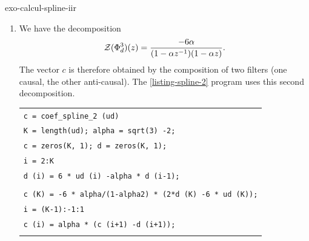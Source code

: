 \begin{correction}{exo-calcul-spline-iir}
\begin{enumerate}
\item We have the decomposition
\begin{equation*}
\mathcal{Z} (\Phi_d^3) (z) = \frac{-6 \alpha}{(1- \alpha z^{-1}) (1- \alpha z)}.
\end{equation*}
The vector $ c $ is therefore obtained by the composition of two filters (one causal, the other anti-causal). The \Matlab{} \ref{listing-spline-2} program uses this second decomposition.

\begin{listing} 
\begin{footnotesize} 
{\upshape
\begin{tabular}{l} \texttt{\pfunction c = coef\_spline\_2 (ud)} \\
\texttt{K = length(ud); alpha = sqrt(3) -2;} \\
\texttt{c = zeros(K, 1); d = zeros(K, 1);} \\
\texttt{\pfor i = 2:K} \\
\quad \texttt{d (i) = 6 * ud (i) -alpha * d (i-1);} \\
\texttt{\pend} \\
\texttt{c (K) = -6 * alpha/(1-alpha{\hatverb}2) * (2*d (K) -6 * ud (K));} \\
\texttt{\pfor i = (K-1):-1:1} \\
\quad \texttt{c (i) = alpha * (c (i+1) -d (i+1));} \\
\texttt{\pend} \\
\end{tabular}
}
\end{footnotesize}
\caption{Procedure \texttt{\upshape coef\_spline\_2}}
\label{listing-spline-2}
\end{listing}
\end{enumerate}
\end{correction}
 
